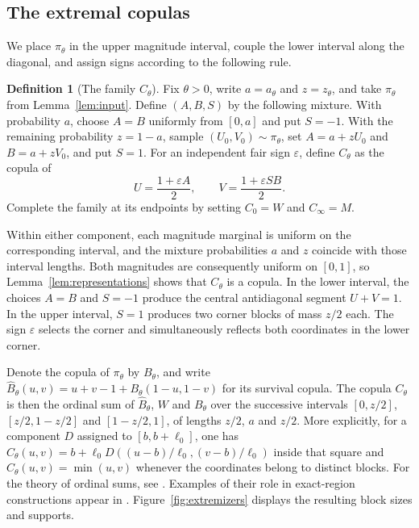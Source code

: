 \documentclass{article}
\theoremstyle{definition}
\newtheorem{definition}[theorem]{Definition}
\theoremstyle{remark}
\newcommand{\1}{\mathds{1}}
\newcommand{\I}{[0,1]}
\begin{document}
\subsection{The extremal copulas}\label{sec:extremizers}

We place $\pi_\theta$ in the upper magnitude interval, couple the lower
interval along the diagonal, and assign signs according to the following rule.

\begin{definition}[The family $C_\theta$]\label{def:extremizers}
	Fix $\theta>0$, write $a=a_\theta$ and $z=z_\theta$, and take $\pi_\theta$ from Lemma~\ref{lem:input}.
	Define $(A,B,S)$ by the following mixture. With probability $a$, choose $A=B$ uniformly from $[0,a]$ and put $S=-1$. With the remaining probability $z=1-a$, sample $(U_0,V_0)\sim\pi_\theta$, set $A=a+zU_0$ and $B=a+zV_0$, and put $S=1$.
	For an independent fair sign $\varepsilon$, define $C_\theta$ as the copula of
	\[
		U=\frac{1+\varepsilon A}{2},\qquad V=\frac{1+\varepsilon SB}{2}.
	\]
	Complete the family at its endpoints by setting $C_0=W$ and $C_\infty=M$.
\end{definition}

Within either component, each magnitude marginal is uniform on the corresponding interval, and the mixture probabilities $a$ and $z$ coincide with those interval lengths. Both magnitudes are consequently uniform on $\I$, so Lemma~\ref{lem:representations} shows that $C_\theta$ is a copula.
In the lower interval, the choices $A=B$ and $S=-1$ produce the central antidiagonal segment $U+V=1$. In the upper interval, $S=1$ produces two corner blocks of mass $z/2$ each. The sign $\varepsilon$ selects the corner and simultaneously reflects both coordinates in the lower corner.

Denote the copula of $\pi_\theta$ by $B_\theta$, and write $\widehat B_\theta(u,v)=u+v-1+B_\theta(1-u,1-v)$ for its survival copula.
The copula $C_\theta$ is then the ordinal sum of $\widehat B_\theta$, $W$ and $B_\theta$ over the successive intervals $[0,z/2]$, $[z/2,1-z/2]$ and $[1-z/2,1]$, of lengths $z/2$, $a$ and $z/2$.
More explicitly, for a component $D$ assigned to $[b,b+\ell_0]$, one has $C_\theta(u,v)=b+\ell_0D((u-b)/\ell_0,(v-b)/\ell_0)$ inside that square and $C_\theta(u,v)=\min(u,v)$ whenever the coordinates belong to distinct blocks.
For the theory of ordinal sums, see \citet{durante2015principles}. Examples of their role in exact-region constructions appear in \citet{bukovsek2026exact,orendaylares2026exact}.
Figure~\ref{fig:extremizers} displays the resulting block sizes and supports.
\end{document}
